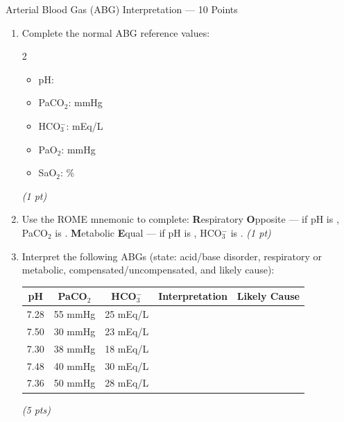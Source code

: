 \documentclass[11pt,letterpaper]{article}
\newcommand{\blank}[1][3cm]{\underline{\hspace{#1}}}
\begin{document}
\begin{diagbox}{Arterial Blood Gas (ABG) Interpretation --- 10 Points}

\begin{enumerate}[leftmargin=1.5em, label=\textbf{\arabic*.},start=131]

  \item Complete the normal ABG reference values:
        \begin{multicols}{2}
        \begin{itemize}[leftmargin=1em]
          \item pH: \blank[2.5cm]
          \item PaCO$_2$: \blank[2.5cm] mmHg
          \item HCO$_3^-$: \blank[2.5cm] mEq/L
          \item PaO$_2$: \blank[2.5cm] mmHg
          \item SaO$_2$: \blank[2.5cm]\%
        \end{itemize}
        \end{multicols}
        \hfill\textit{(1 pt)}

  \item Use the ROME mnemonic to complete:
        \textbf{R}espiratory \textbf{O}pposite --- if pH is \blank[1.5cm],
        PaCO$_2$ is \blank[1.5cm].
        \textbf{M}etabolic \textbf{E}qual --- if pH is \blank[1.5cm],
        HCO$_3^-$ is \blank[1.5cm].
        \hfill\textit{(1 pt)}

  \item Interpret the following ABGs (state: acid/base disorder, respiratory or
        metabolic, compensated/uncompensated, and likely cause):

  \vspace{0.3cm}
  \begin{center}
  \renewcommand{\arraystretch}{1.9}
  \begin{tabular}{|c|c|c|p{2.5cm}|p{3.8cm}|}
  \hline
  \textbf{pH} & \textbf{PaCO$_2$} & \textbf{HCO$_3^-$} & \textbf{Interpretation} & \textbf{Likely Cause} \\
  \hline
  7.28 & 55 mmHg & 25 mEq/L & \blank[2.2cm] & \blank[3.8cm] \\
  \hline
  7.50 & 30 mmHg & 23 mEq/L & \blank[2.2cm] & \blank[3.8cm] \\
  \hline
  7.30 & 38 mmHg & 18 mEq/L & \blank[2.2cm] & \blank[3.8cm] \\
  \hline
  7.48 & 40 mmHg & 30 mEq/L & \blank[2.2cm] & \blank[3.8cm] \\
  \hline
  7.36 & 50 mmHg & 28 mEq/L & \blank[2.2cm] & \blank[3.8cm] \\
  \hline
  \end{tabular}
  \end{center}
  \hfill\textit{(5 pts)}


\end{enumerate}
\end{diagbox}
\end{document}
